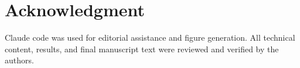 \documentclass[letterpaper, 10 pt, conference]{ieeeconf}
\begin{document}
\section*{Acknowledgment}
Claude code was used for editorial assistance and figure generation. All technical content, results, and final manuscript text were reviewed and verified by the authors.





\printbibliography{}
\end{document}
